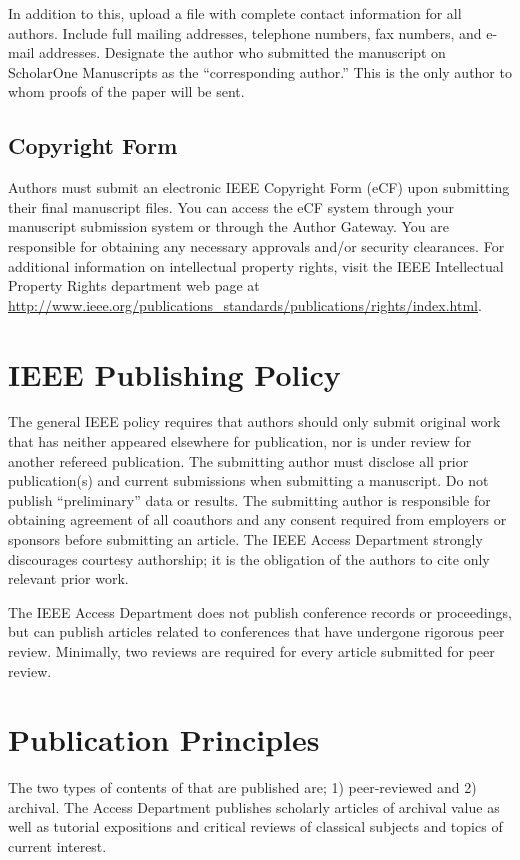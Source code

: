 \documentclass{ieeeaccess}
\begin{document}
In addition to this, upload a file with complete contact information for all 
authors. Include full mailing addresses, telephone numbers, fax numbers, and 
e-mail addresses. Designate the author who submitted the manuscript on 
ScholarOne Manuscripts as the ``corresponding author.'' This is the only 
author to whom proofs of the paper will be sent. 

\subsection{Copyright Form}
Authors must submit an electronic IEEE Copyright Form (eCF) upon submitting 
their final manuscript files. You can access the eCF system through your 
manuscript submission system or through the Author Gateway. You are 
responsible for obtaining any necessary approvals and/or security 
clearances. For additional information on intellectual property rights, 
visit the IEEE Intellectual Property Rights department web page at 
\underline{http://www.ieee.org/publications\_standards/publications/}\break\underline{rights/index.html}. 

\section{IEEE Publishing Policy}
The general IEEE policy requires that authors should only submit original 
work that has neither appeared elsewhere for publication, nor is under 
review for another refereed publication. The submitting author must disclose 
all prior publication(s) and current submissions when submitting a 
manuscript. Do not publish ``preliminary'' data or results. The submitting 
author is responsible for obtaining agreement of all coauthors and any 
consent required from employers or sponsors before submitting an article. 
The IEEE Access Department strongly discourages courtesy 
authorship; it is the obligation of the authors to cite only relevant prior 
work.

The IEEE Access Department does not publish conference 
records or proceedings, but can publish articles related to conferences that 
have undergone rigorous peer review. Minimally, two reviews are required for 
every article submitted for peer review.

\section{Publication Principles}
The two types of contents of that are published are; 1) peer-reviewed and 2) 
archival. The Access Department publishes scholarly 
articles of archival value as well as tutorial expositions and critical 
reviews of classical subjects and topics of current interest. 
\end{document}
